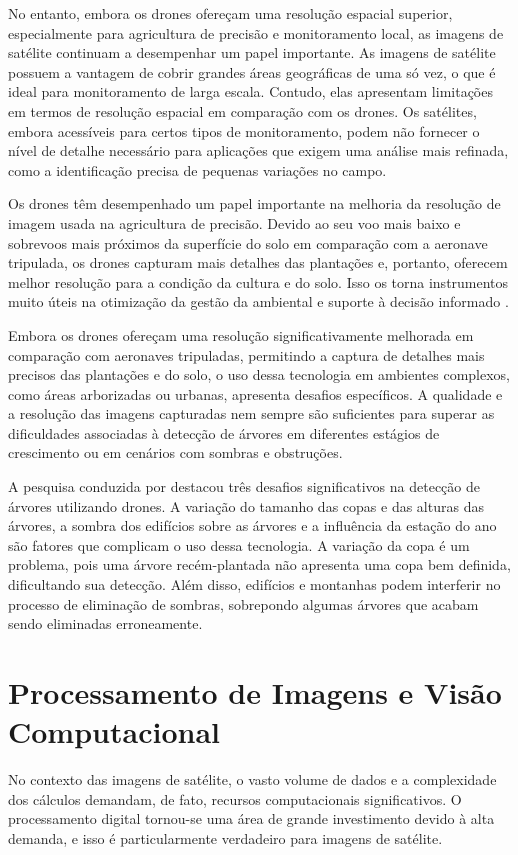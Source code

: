 \documentclass[
    12pt,                   %
    openright,              %
    oneside,                %
    a4paper,                %
    sumario=tradicional,    %
    english,                %
    brazil,                 %
    ]{abntex2}
\begin{document}
    No entanto, embora os drones ofereçam uma resolução espacial superior, especialmente para agricultura de precisão e monitoramento local, as imagens de satélite continuam a desempenhar um papel importante. As imagens de satélite possuem a vantagem de cobrir grandes áreas geográficas de uma só vez, o que é ideal para monitoramento de larga escala. Contudo, elas apresentam limitações em termos de resolução espacial em comparação com os drones. Os satélites, embora acessíveis para certos tipos de monitoramento, podem não fornecer o nível de detalhe necessário para aplicações que exigem uma análise mais refinada, como a identificação precisa de pequenas variações no campo.

    Os drones têm desempenhado um papel importante na melhoria da resolução de imagem usada na agricultura de precisão. Devido ao seu voo mais baixo e sobrevoos mais próximos da superfície do solo em comparação com a aeronave tripulada, os drones capturam mais detalhes das plantações e, portanto, oferecem melhor resolução para a condição da cultura e do solo. Isso os torna instrumentos muito úteis na otimização da gestão da ambiental e suporte à decisão informado \cite{Phang2023}.
    
    Embora os drones ofereçam uma resolução significativamente melhorada em comparação com aeronaves tripuladas, permitindo a captura de detalhes mais precisos das plantações e do solo, o uso dessa tecnologia em ambientes complexos, como áreas arborizadas ou urbanas, apresenta desafios específicos. A qualidade e a resolução das imagens capturadas nem sempre são suficientes para superar as dificuldades associadas à detecção de árvores em diferentes estágios de crescimento ou em cenários com sombras e obstruções.

    A pesquisa conduzida por \textcite{neto2012detecccao} destacou três desafios significativos na detecção de árvores utilizando drones. A variação do tamanho das copas e das alturas das árvores, a sombra dos edifícios sobre as árvores e a influência da estação do ano são fatores que complicam o uso dessa tecnologia. A variação da copa é um problema, pois uma árvore recém-plantada não apresenta uma copa bem definida, dificultando sua detecção. Além disso, edifícios e montanhas podem interferir no processo de eliminação de sombras, sobrepondo algumas árvores que acabam sendo eliminadas erroneamente.
    

\section{Processamento de Imagens e Visão Computacional}
    No contexto das imagens de satélite, o vasto volume de dados e a complexidade dos cálculos demandam, de fato, recursos computacionais significativos. O processamento digital tornou-se uma área de grande investimento devido à alta demanda, e isso é particularmente verdadeiro para imagens de satélite.
    
\end{document}
